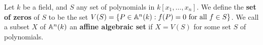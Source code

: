 \begin{definition}
  Let $k$ be a field, and $S$ any set of polynomials in $k[x_1, \dots, x_n]$.
  We define the \textbf{set of zeros} of $S$ to be the set  $V(S)=\{P \in
  \mathbb{A}^n(k) : f(P)=0 \text{ for all } f \in S\}$. We call a subset $X$ of
  $\mathbb{A}^n(k)$ an \textbf{affine algebraic set} if $X=V(S)$ for some set $S$ of
  polynomials.
\end{definition}
